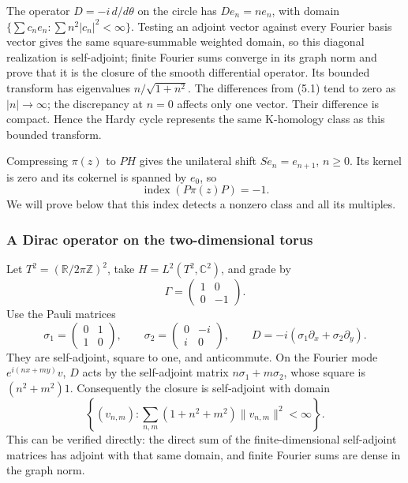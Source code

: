 \documentclass[
  11pt,
]{article}
\begin{document}
The operator \(D=-i\,d/d\theta\) on the circle has \(De_n=ne_n\), with
domain \(\{\sum c_ne_n:\sum n^2|c_n|^2<\infty\}\). Testing an adjoint
vector against every Fourier basis vector gives the same square-summable
weighted domain, so this diagonal realization is self-adjoint; finite
Fourier sums converge in its graph norm and prove that it is the closure
of the smooth differential operator. Its bounded transform has
eigenvalues \(n/\sqrt{1+n^2}\). The differences from (5.1) tend to zero
as \(|n|\to\infty\); the discrepancy at \(n=0\) affects only one vector.
Their difference is compact. Hence the Hardy cycle represents the same
K-homology class as this bounded transform.

Compressing \(\pi(z)\) to \(PH\) gives the unilateral shift
\(Se_n=e_{n+1}\), \(n\geq0\). Its kernel is zero and its cokernel is
spanned by \(e_0\), so \[
\operatorname{index}(P\pi(z)P)=-1.
\tag{5.2}
\] We will prove below that this index detects a nonzero class and all
its multiples.

\subsubsection{A Dirac operator on the two-dimensional
torus}\label{a-dirac-operator-on-the-two-dimensional-torus}

Let \(T^2=(\mathbb R/2\pi\mathbb Z)^2\), take
\(H=L^2(T^2,\mathbb C^2)\), and grade by \[
\Gamma=\begin{pmatrix}1&0\\0&-1\end{pmatrix}.
\] Use the Pauli matrices \[
\sigma_1=\begin{pmatrix}0&1\\1&0\end{pmatrix},\qquad
\sigma_2=\begin{pmatrix}0&-i\\i&0\end{pmatrix},
\qquad D=-i(\sigma_1\partial_x+\sigma_2\partial_y).
\tag{5.3}
\] They are self-adjoint, square to one, and anticommute. On the Fourier
mode \(e^{i(nx+my)}v\), \(D\) acts by the self-adjoint matrix
\(n\sigma_1+m\sigma_2\), whose square is \((n^2+m^2)1\). Consequently
the closure is self-adjoint with domain \[
\left\{(v_{n,m}):\sum_{n,m}(1+n^2+m^2)\|v_{n,m}\|^2<\infty\right\}.
\] This can be verified directly: the direct sum of the
finite-dimensional self-adjoint matrices has adjoint with that same
domain, and finite Fourier sums are dense in the graph norm.
\end{document}
